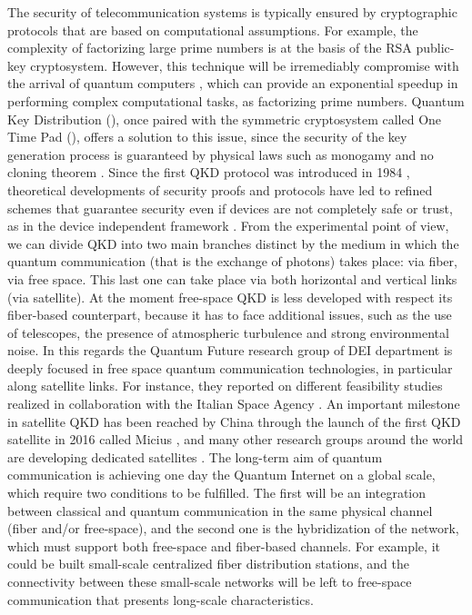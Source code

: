 The security of telecommunication systems is typically ensured by cryptographic protocols that are based on computational assumptions. For example, the complexity of factorizing large prime numbers is at the basis of the RSA public-key cryptosystem. However, this technique will be irremediably compromise with the arrival of quantum computers \cite{a1,a2,a3}, which can provide an exponential speedup \cite{a4} in performing complex computational tasks, as factorizing prime numbers. Quantum Key Distribution (), once paired with the symmetric cryptosystem called One Time Pad (), offers a solution to this issue, since the security of the key generation process is guaranteed by physical laws such as monogamy and no cloning theorem \cite{a5}.
Since the first QKD protocol was introduced in 1984 \cite{a6}, theoretical developments of security proofs and protocols have led to refined schemes that guarantee security even if devices are not completely safe or trust, as in the device independent framework \cite{a5,a6,a7,a8,a9,a10,a11}.
From the experimental point of view, we can divide QKD into two main branches distinct by the medium in which the quantum communication (that is the exchange of photons) takes place: via fiber, via free space. This last one can take place via both horizontal and vertical links (via satellite). At the moment free-space QKD is less developed with respect its fiber-based counterpart, because it has to face additional issues, such as the use of telescopes, the presence of atmospheric turbulence and strong environmental noise. In this regards the Quantum Future research group of DEI department is deeply focused in free space quantum communication technologies, in particular along satellite links. For instance, they reported on different feasibility studies realized in collaboration with the Italian Space Agency \cite{a12,a13,a14}. An important milestone in satellite QKD has been reached by China through the launch of the first QKD satellite in 2016 called Micius \cite{a15}, and many other research groups around the world are developing dedicated satellites \cite{a16,a17,a18}. The long-term aim of quantum communication is achieving one day the Quantum Internet \cite{a19} on a global scale, which require two conditions to be fulfilled. The first will be an integration between classical and quantum communication in the same physical channel (fiber and/or free-space), and the second one is the hybridization of the network, which must support both free-space and fiber-based channels. For example, it could be built small-scale centralized fiber distribution stations, and the connectivity between these small-scale networks will be left to free-space communication that presents long-scale characteristics.


